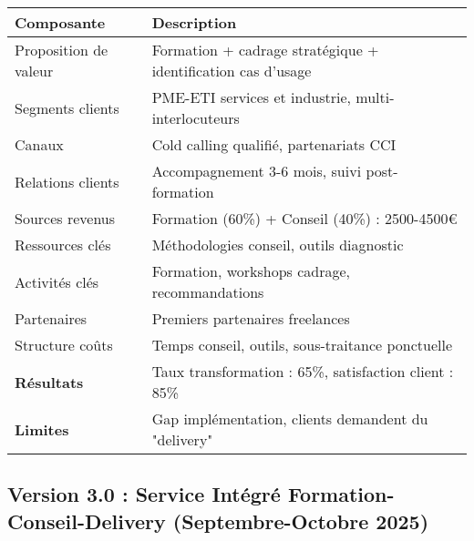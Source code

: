 \begin{longtable}{@{}>{\raggedright\arraybackslash}p{4cm}>{\raggedright\arraybackslash}p{10cm}@{}}
\toprule
\textbf{Composante} & \textbf{Description} \\
\midrule
Proposition de valeur & Formation + cadrage stratégique + identification cas d'usage \\
Segments clients & PME-ETI services et industrie, multi-interlocuteurs \\
Canaux & Cold calling qualifié, partenariats CCI \\
Relations clients & Accompagnement 3-6 mois, suivi post-formation \\
Sources revenus & Formation (60\%) + Conseil (40\%) : 2500-4500€ \\
Ressources clés & Méthodologies conseil, outils diagnostic \\
Activités clés & Formation, workshops cadrage, recommandations \\
Partenaires & Premiers partenaires freelances \\
Structure coûts & Temps conseil, outils, sous-traitance ponctuelle \\
\midrule
\textbf{Résultats} & Taux transformation : 65\%, satisfaction client : 85\% \\
\textbf{Limites} & Gap implémentation, clients demandent du "delivery" \\
\bottomrule
\end{longtable}

\subsection{Version 3.0 : Service Intégré Formation-Conseil-Delivery (Septembre-Octobre 2025)}

